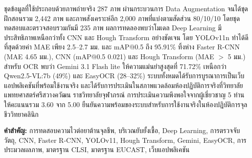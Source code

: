 ชุดข้อมูลที่ใช้ประกอบด้วยภาพถ่ายจริง 287 ภาพ ผ่านกระบวนการ Data Augmentation จนได้ชุดฝึกสอนรวม 2,442 ภาพ และภาพสังเคราะห์อีก 2,000 ภาพที่แบ่งตามสัดส่วน 80/10/10 โดยชุดทดสอบและตรวจสอบรวมกันมี 235 ภาพ ผลการทดลองพบว่าโมเดล Deep Learning มีประสิทธิภาพเหนือกว่าทั้ง CNN และ Hough Transform อย่างชัดเจน โดย YOLOv11n ทำได้ดีที่สุดด้วยค่า MAE เพียง 2.5--2.7 มม. และ mAP@0.5 ถึง 95.91\% ทิ้งห่าง Faster R-CNN (MAE 4.65 มม.), CNN (mAP@0.5 0.021) และ Hough Transform (MAE $>$ 5 มม.) สำหรับ OCR พบว่า Gemini 3.1 Flash lite ให้ความแม่นยำสูงสุดที่ 71.72\% เหนือกว่า Qwen2.5-VL:7b (49\%) และ EasyOCR (28--32\%) ระบบทั้งหมดได้รับการบูรณาการเป็นเว็บแอปพลิเคชันที่พร้อมใช้งานจริง และได้รับการประเมินในสภาพแวดล้อมห้องปฏิบัติการจริงที่วิทยาลัยแพทยศาสตร์ศรีสวางควัฒน ราชวิทยาลัยจุฬาภรณ์ การประเมินความพึงพอใจจากผู้เชี่ยวชาญ 5 ท่านให้คะแนนรวม 3.60 จาก 5.00 ยืนยันความพร้อมของระบบสำหรับการใช้งานจริงในห้องปฏิบัติการจุลชีววิทยาคลินิก

\noindent\textbf{คำสำคัญ:} การทดสอบความไวต่อยาต้านจุลชีพ, บริเวณยับยั้งเชื้อ, Deep Learning, การตรวจจับวัตถุ,
CNN, Faster R-CNN, YOLOv11, Hough Transform, Gemini, EasyOCR, การประมวลผลภาพ, มาตรฐาน CLSI, มาตรฐาน EUCAST, เว็บแอปพลิเคชัน

\newpage
